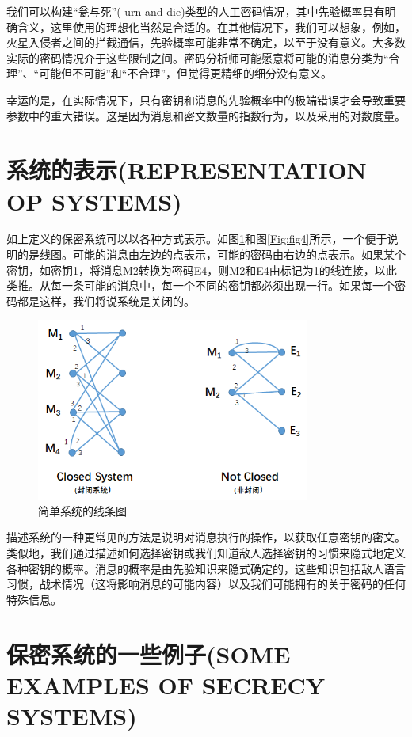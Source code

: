 \documentclass[]{article}
\begin{document}
我们可以构建“瓮与死”( urn and die)类型的人工密码情况，其中先验概率具有明确含义，这里使用的理想化当然是合适的。在其他情况下，我们可以想象，例如，火星入侵者之间的拦截通信，先验概率可能非常不确定，以至于没有意义。大多数实际的密码情况介于这些限制之间。密码分析师可能愿意将可能的消息分类为“合理”、“可能但不可能”和“不合理”，但觉得更精细的细分没有意义。

幸运的是，在实际情况下，只有密钥和消息的先验概率中的极端错误才会导致重要参数中的重大错误。这是因为消息和密文数量的指数行为，以及采用的对数度量。

\section{系统的表示(REPRESENTATION OP SYSTEMS)}
如上定义的保密系统可以以各种方式表示。如图\ref{Fig:fig2}和图\ref{Fig:fig4}所示，一个便于说明的是线图。可能的消息由左边的点表示，可能的密码由右边的点表示。如果某个密钥，如密钥1，将消息M2转换为密码E4，则M2和E4由标记为1的线连接，以此类推。从每一条可能的消息中，每一个不同的密钥都必须出现一行。如果每一个密码都是这样，我们将说系统是关闭的。

\begin{figure}[htbp]
	\centering
	\includegraphics[width=0.8\textwidth]{fig-2.png}
	\caption{简单系统的线条图}
	\label{Fig:fig2}
\end{figure}

描述系统的一种更常见的方法是说明对消息执行的操作，以获取任意密钥的密文。类似地，我们通过描述如何选择密钥或我们知道敌人选择密钥的习惯来隐式地定义各种密钥的概率。消息的概率是由先验知识来隐式确定的，这些知识包括敌人语言习惯，战术情况（这将影响消息的可能内容）以及我们可能拥有的关于密码的任何特殊信息。


\section{保密系统的一些例子(SOME EXAMPLES OF SECRECY SYSTEMS)}
\end{document}
